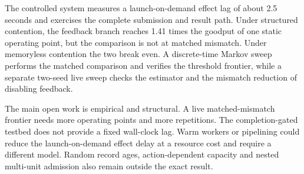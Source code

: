 \documentclass[10pt,conference,letterpaper]{IEEEtran}
\begin{document}
The controlled system measures a launch-on-demand effect lag of about 2.5 seconds
and exercises the complete submission and result path. Under structured
contention, the feedback branch reaches 1.41 times the goodput of one static
operating point, but the comparison is not at matched mismatch. Under memoryless
contention the two break even. A discrete-time Markov sweep performs the matched
comparison and verifies the threshold frontier, while a separate two-seed live
sweep checks the estimator and the mismatch reduction of disabling feedback.

The main open work is empirical and structural. A live matched-mismatch frontier
needs more operating points and more repetitions. The completion-gated testbed
does not provide a fixed wall-clock lag. Warm workers or pipelining could reduce
the launch-on-demand effect delay at a resource cost and require a different
model. Random record ages, action-dependent capacity and nested multi-unit
admission also remain outside the exact result.

\appendices




\end{document}
